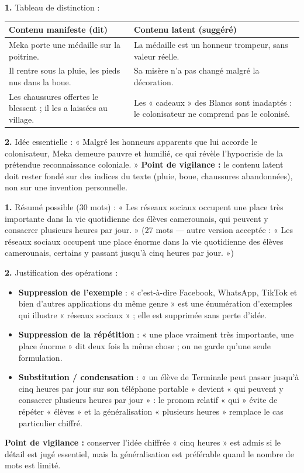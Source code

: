 \documentclass[11pt]{article}
\begin{document}
\begin{corrige}
\textbf{1.} Tableau de distinction :
\begin{center}
\begin{tabularx}{\linewidth}{|X|X|}
\hline
\rowcolor{popblueL} \textbf{Contenu manifeste (dit)} & \textbf{Contenu latent (suggéré)} \\
\hline
Meka porte une médaille sur la poitrine. & La médaille est un honneur trompeur, sans valeur réelle. \\
\hline
Il rentre sous la pluie, les pieds nus dans la boue. & Sa misère n'a pas changé malgré la décoration. \\
\hline
Les chaussures offertes le blessent ; il les a laissées au village. & Les « cadeaux » des Blancs sont inadaptés : le colonisateur ne comprend pas le colonisé. \\
\hline
\end{tabularx}
\end{center}
\textbf{2.} Idée essentielle : « Malgré les honneurs apparents que lui accorde le colonisateur, Meka demeure pauvre et humilié, ce qui révèle l'hypocrisie de la prétendue reconnaissance coloniale. »
\textbf{Point de vigilance :} le contenu latent doit rester fondé sur des indices du texte (pluie, boue, chaussures abandonnées), non sur une invention personnelle.
\end{corrige}

\begin{corrige}
\textbf{1.} Résumé possible (30 mots) : « Les réseaux sociaux occupent une place très importante dans la vie quotidienne des élèves camerounais, qui peuvent y consacrer plusieurs heures par jour. » (27 mots — autre version acceptée : « Les réseaux sociaux occupent une place énorme dans la vie quotidienne des élèves camerounais, certains y passant jusqu'à cinq heures par jour. »)

\textbf{2.} Justification des opérations :
\begin{itemize}
\item \textbf{Suppression de l'exemple} : « c'est-à-dire Facebook, WhatsApp, TikTok et bien d'autres applications du même genre » est une énumération d'exemples qui illustre « réseaux sociaux » ; elle est supprimée sans perte d'idée.
\item \textbf{Suppression de la répétition} : « une place vraiment très importante, une place énorme » dit deux fois la même chose ; on ne garde qu'une seule formulation.
\item \textbf{Substitution / condensation} : « un élève de Terminale peut passer jusqu'à cinq heures par jour sur son téléphone portable » devient « qui peuvent y consacrer plusieurs heures par jour » : le pronom relatif « qui » évite de répéter « élèves » et la généralisation « plusieurs heures » remplace le cas particulier chiffré.
\end{itemize}
\textbf{Point de vigilance :} conserver l'idée chiffrée « cinq heures » est admis si le détail est jugé essentiel, mais la généralisation est préférable quand le nombre de mots est limité.
\end{corrige}
\end{document}
